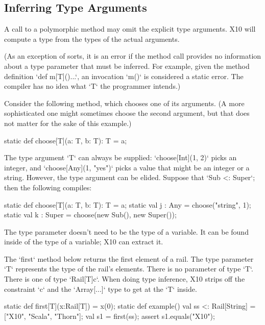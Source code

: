 \subsection{Inferring Type Arguments}
\label{TypeParamInfer}


A call to a polymorphic method %
may omit the
explicit type arguments.  
X10 will compute a type from the types of the actual arguments. 

(As an exception of sorts, it is an error if the method call provides no information about
a type parameter that must be inferred.  For example, given the method
definition \xcd`def m[T](){...}`, an invocation \xcd`m()` is considered a
static error.  The compiler has no idea what \xcd`T` the programmer intends.)



\begin{ex}Consider the following method, which chooses one of its arguments.  (A more
sophisticated one might sometimes choose the second argument, but that does
not matter for the sake of this example.)
\begin{xten}
static def choose[T](a: T, b: T): T = a; 
\end{xten}


The type argument \xcd`T` can always be supplied: 
\xcd`choose[Int](1, 2)` picks an integer, 
and \xcd`choose[Any](1, "yes")` picks a value that might be an integer or a
string.  
However, the type argument can be elided.  Suppose that \xcd`Sub <: Super`;
then the following compiles: 

\begin{xten}
  static def choose[T](a: T, b: T): T = a; 
  static val j : Any = choose("string", 1);
  static val k : Super = choose(new Sub(), new Super());
\end{xten}
\end{ex}

The type parameter doesn't need to be the type of a variable. It can be found
inside of the type of a variable; X10 can extract it.

\begin{ex}
The \xcd`first` method below returns the first element of a rail.  
The type parameter \xcd`T` represents the type of the rail's
elements. There is no parameter of type \xcd`T`. There is one of type
\xcd`Rail[T]{c}`.  When doing type inference, 
X10 strips off the constraint \xcd`{c}` and the
\xcd`Array[...]` type to get at the \xcd`T` inside.
\begin{xten}
static def first[T](x:Rail[T]) = x(0);
static def example() {
  val ss <: Rail[String] = ["X10", "Scala", "Thorn"];
  val s1 = first(ss);
  assert s1.equals("X10");
}
\end{xten}

\end{ex}


